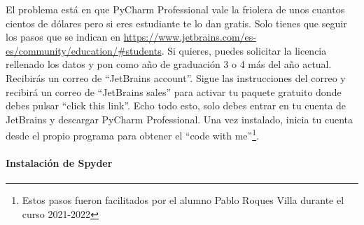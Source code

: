 El problema está en que PyCharm Professional vale la friolera de unos cuantos cientos de dólares pero si eres estudiante te lo dan gratis. 
Solo tienes que seguir los pasos que se indican en \url{https://www.jetbrains.com/es-es/community/education/#students}.
Si quieres, puedes solicitar la licencia rellenado los datos y pon como año de graduación 3 o 4 más del año actual. Recibirás un correo de ``JetBrains account''.  Sigue las instrucciones del correo y recibirá un correo de “JetBrains sales” para activar tu paquete gratuito donde debes pulsar ``click this link''. Echo todo esto, solo debes entrar en tu cuenta de JetBrains y descargar PyCharm Professional. Una vez instalado, inicia tu cuenta desde el propio programa para obtener el ``code with me''\footnote{Estos pasos fueron facilitados por el alumno Pablo Roques Villa durante el curso 2021-2022}. 


\paragraph{Instalación de Spyder}

